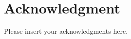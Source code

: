 \documentclass[lettersize,journal]{IEEEtran}
\begin{document}




\section*{Acknowledgment}
Please insert your acknowledgments here.



\end{document}
